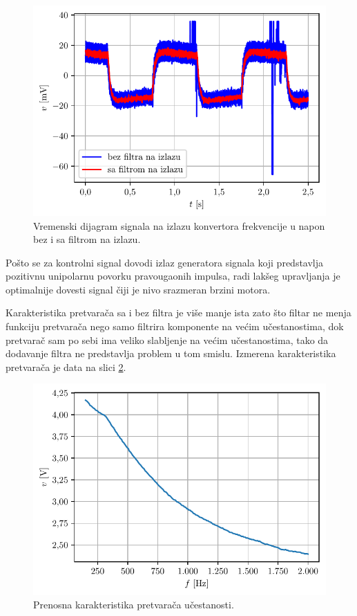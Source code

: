 \documentclass[a4paper, 12pt, diplomski]{etf}
\begin{document}
\begin{figure}[h!]
    \centering
    \includegraphics[scale=1]{fig_osc/filtar_preklopljen.pdf}
    \caption{Vremenski dijagram signala na izlazu konvertora frekvencije u napon bez i sa filtrom na izlazu.}
    \label{preklopljeni}
\end{figure}


Pošto se za kontrolni signal dovodi izlaz generatora signala koji predstavlja pozitivnu unipolarnu povorku pravougaonih impulsa, radi lakšeg upravljanja je optimalnije dovesti signal čiji je nivo srazmeran brzini motora. 

Karakteristika pretvarača sa i bez filtra je više manje ista zato što filtar ne menja funkciju pretvarača nego samo filtrira komponente na većim učestanostima, dok pretvarač sam po sebi ima  veliko slabljenje na većim učestanostima, tako da dodavanje filtra ne predstavlja problem u tom smislu. Izmerena karakteristika pretvarača je data na slici \ref{FVkka}.

\begin{figure}[h!]
    \centering
    \includegraphics[scale=1]{fig_osc/FVkka.pdf}
    \caption{Prenosna karakteristika pretvarača učestanosti.}
    \label{FVkka}
\end{figure}
\end{document}
